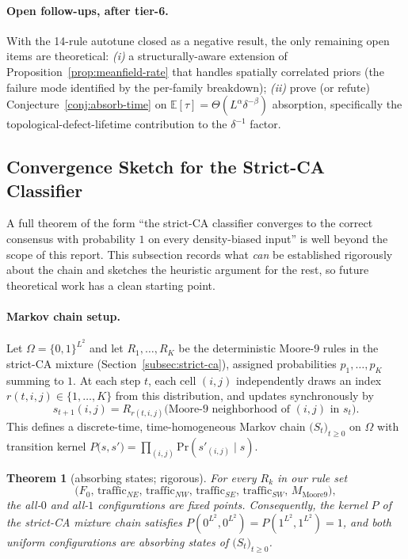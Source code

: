 \documentclass[11pt,a4paper]{article}
\newtheorem{theorem}{Theorem}
\begin{document}
\paragraph{Open follow-ups, after tier-6.}
With the 14-rule autotune closed as a negative result, the only
remaining open items are theoretical:
\emph{(i)} a structurally-aware extension of
Proposition~\ref{prop:meanfield-rate} that handles spatially
correlated priors (the failure mode identified by the per-family
breakdown);
\emph{(ii)} prove (or refute) Conjecture~\ref{conj:absorb-time} on
\(\mathbb{E}[\tau] = \Theta(L^{\alpha} \delta^{-\beta})\)
absorption, specifically the topological-defect-lifetime
contribution to the \(\delta^{-1}\) factor.

\subsection{Convergence Sketch for the Strict-CA Classifier}
\label{subsec:strict-ca-theory}

A full theorem of the form ``the strict-CA classifier converges to the
correct consensus with probability \(1\) on every density-biased
input'' is well beyond the scope of this report.  This subsection
records what \emph{can} be established rigorously about the chain and
sketches the heuristic argument for the rest, so future theoretical
work has a clean starting point.

\paragraph{Markov chain setup.}
Let \(\Omega = \{0,1\}^{L^2}\) and let \(R_1,\ldots,R_K\) be the
deterministic Moore-9 rules in the strict-CA mixture
(Section~\ref{subsec:strict-ca}), assigned probabilities
\(p_1,\ldots,p_K\) summing to \(1\).  At each step \(t\), each cell
\((i,j)\) independently draws an index \(r(t,i,j) \in \{1,\ldots,K\}\)
from this distribution, and updates synchronously by
\[
s_{t+1}(i,j) = R_{r(t,i,j)}\bigl(\text{Moore-9 neighborhood of }(i,j)\text{ in }s_t\bigr).
\]
This defines a discrete-time, time-homogeneous Markov chain
\(\bigl(S_t\bigr)_{t \geq 0}\) on \(\Omega\) with transition kernel
\(P\bigl(s, s'\bigr) = \prod_{(i,j)} \mathrm{Pr}(s'_{(i,j)} \mid s)\).

\begin{theorem}[absorbing states; rigorous]
\label{thm:absorb}
For every \(R_k\) in our rule set
\[
\bigl(F_0,\,\mathrm{traffic}_{NE},\,\mathrm{traffic}_{NW},\,
       \mathrm{traffic}_{SE},\,\mathrm{traffic}_{SW},\,M_{\mathrm{Moore9}}\bigr),
\]
the all-\(0\) and all-\(1\) configurations are fixed points.
Consequently, the kernel \(P\) of the strict-CA mixture chain
satisfies \(P(0^{L^2}, 0^{L^2}) = P(1^{L^2}, 1^{L^2}) = 1\), and
both uniform configurations are absorbing states of
\(\bigl(S_t\bigr)_{t \geq 0}\).
\end{theorem}
\end{document}
